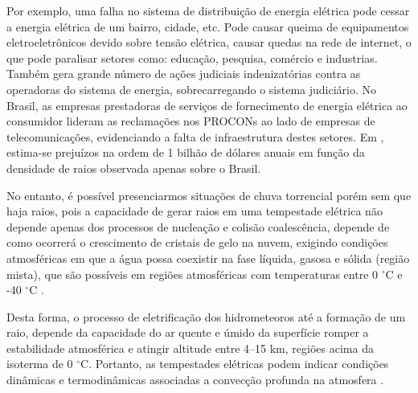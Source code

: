 Por exemplo, uma falha no sistema de distribuição de energia elétrica pode cessar a energia elétrica de um bairro, cidade, etc. Pode causar queima de equipamentos eletroeletrônicos devido sobre tensão elétrica, causar quedas na rede de internet, o que pode paralisar  setores como: educação, pesquisa, comércio e industrias. Também gera grande número de ações judiciais indenizatórias contra as operadoras do sistema de energia, sobrecarregando o sistema judiciário. No Brasil, as empresas prestadoras de serviços de  fornecimento de energia elétrica ao consumidor lideram as reclamações nos PROCONs ao lado de empresas de telecomunicações, evidenciando a falta de infraestrutura destes setores. Em , estima-se prejuízos na ordem de 1 bilhão de dólares anuais em função da densidade de raios observada apenas sobre o Brasil. 
  


No entanto, é possível presenciarmos situações de chuva torrencial porém sem que haja raios, pois a capacidade de gerar raios em uma tempestade elétrica não depende apenas dos processos de nucleação e colisão coalescência, depende de como ocorrerá o crescimento de cristais de gelo na nuvem, exigindo condições atmosféricas em que a água possa coexistir na fase líquida, gasosa e sólida (região mista), que são possíveis em regiões atmosféricas com temperaturas entre 0 $^{\circ}$C e -40 $^{\circ}$C \cite{Takahashi1978,williams1991mixed,korolev2007}.

Desta forma, o processo de eletrificação dos hidrometeoros até a formação de um raio, depende da capacidade do ar quente e úmido da superfície romper a estabilidade atmosférica e atingir altitude entre 4--15 km, regiões acima da isoterma de 0 $^{\circ}$C. Portanto, as tempestades elétricas podem indicar condições dinâmicas e termodinâmicas associadas a convecção profunda na atmosfera \cite{doswell2001,zipser2006}.

